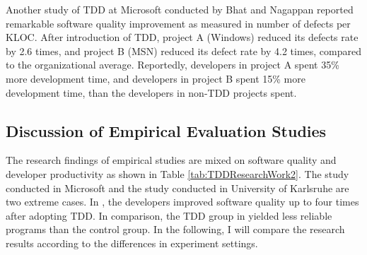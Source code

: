 \documentclass[smallextended]{svjour3}     %
\begin{document}
Another study of TDD at Microsoft conducted by Bhat and Nagappan
\cite{Bhat:06} reported remarkable software quality improvement as 
measured in number of defects per KLOC. After introduction of TDD, 
project A (Windows) reduced its defects rate by 2.6 times, and project 
B (MSN) reduced its defect rate by 4.2 times, compared to the organizational
average. Reportedly, developers in project A spent 35\% more development
time, and developers in project B spent 15\% more development time, than
the developers in non-TDD projects spent.

\subsection{Discussion of Empirical Evaluation Studies}
The research findings of empirical studies are mixed on software quality 
and developer productivity as shown in Table \ref{tab:TDDResearchWork2}. 
The study conducted in Microsoft \cite{Bhat:06} and the study conducted 
in University of Karlsruhe \cite{Muller:02} are two extreme cases. In 
\cite{Bhat:06}, the developers improved software quality up to four 
times after adopting TDD. In comparison, the TDD group in \cite{Muller:02} 
yielded less reliable programs than the control group. In the following,
I will compare the research results according to the differences in
experiment settings. 
\end{document}
